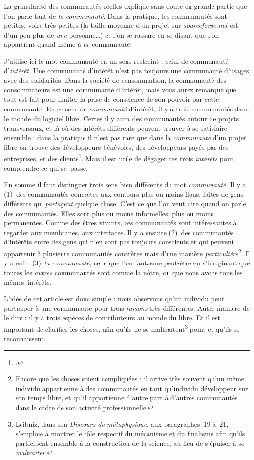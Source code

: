 \documentclass{FramateX}
\begin{document}
\begin{refsection}
La granularité des communautés réelles explique sans doute en grande
partie que l'on parle tant de \textit{la communauté}. Dans la pratique,
les communautés sont petites, voire très petites (la taille moyenne
d'un projet sur \textit{sourceforge.net} est d'un peu plus de
\textit{une }personne…) et l'on se rassure en se disant que l'on
appartient quand même à \textit{la}~communauté. 

J'utilise ici le mot communauté en un sens restreint : celui de
communauté d'\textit{intérêt}. Une communauté d'intérêt n'est pas
toujours une communauté d'usages avec des solidarités. Dans la société
de consommation, la communauté des consommateurs est une communauté
d'intérêt, mais vous aurez remarqué que tout est fait pour limiter la
prise de conscience de son pouvoir par cette communauté. En ce sens de
\textit{communauté }d'intérêt, il y a trois communautés dans le monde
du logiciel libre. Certes il y aura des communautés autour de projets
transversaux, et là où des intérêts différents peuvent trouver à se
satisfaire ensemble : dans la pratique il n'est pas rare que dans la
\textit{communauté }d'un projet libre on trouve des développeurs
bénévoles, des développeurs payés par des entreprises, et des
clients\footnote{\cite{auraysociologie2006}.}. Mais il est utile de
dégager ces trois \textit{intérêts} pour comprendre ce qui se~passe.

En somme il faut distinguer trois sens bien différents du mot
\textit{communauté}. Il y a (1)~des communautés concrètes aux contours
plus ou moins flous, faites de gens différents qui \textit{partagent}
quelque chose. C'est ce que l'on veut dire quand on parle des
communautés. Elles sont plus ou moins informelles, plus ou moins
permanentes. Comme des êtres vivants, ces communautés sont
intéressantes à regarder aux membranes, aux interfaces. Il y a ensuite
(2)~des communautés d'intérêts entre des gens qui n'en sont pas
toujours conscients et qui peuvent appartenir à plusieurs communautés
concrètes mais d'une manière \textit{particulière}\footnote{Encore que les choses soient compliquées : il arrive très souvent qu'un
même individu appartienne à des communautés en tant qu'individu
développeur sur son temps libre, et qu'il appartienne d'autre part à
d'autres communautés dans le cadre de son activité professionnelle.}.
Il y a enfin (3)~\textit{la communauté}, celle que l'on fantasme
peut-être en s'imaginant que toutes les \textit{autres} communautés
sont comme la nôtre, ou que nous avons tous les mêmes~intérêts.

L'idée de cet article est donc simple : nous observons qu'un individu
peut participer à une communauté pour trois \textit{raisons} très
différentes. Autre manière de le dire : il y a trois espèces de
contributeurs au monde du libre. Et il est important de clarifier les
choses, afin qu'ils ne se maltraitent\footnote{Leibniz, dans son
\textit{Discours de métaphysique}, aux paragraphes~19 à~21, s'emploie à
montrer le rôle respectif du mécanisme et du finalisme afin qu'ils
participent ensemble à la construction de la science, au lieu de
s'épuiser à se \textit{maltraiter}.} point et qu'ils se reconnaissent.


\end{refsection}
\end{document}
